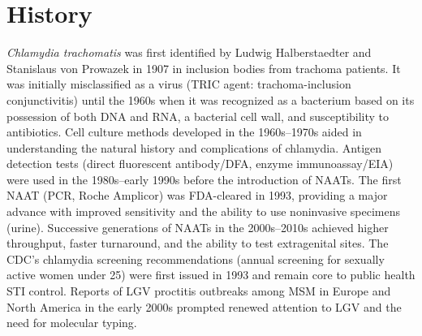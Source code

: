 \section*{History}
\textit{Chlamydia trachomatis} was first identified by Ludwig Halberstaedter and Stanislaus von Prowazek in 1907 in inclusion bodies from trachoma patients. It was initially misclassified as a virus (TRIC agent: trachoma-inclusion conjunctivitis) until the 1960s when it was recognized as a bacterium based on its possession of both DNA and RNA, a bacterial cell wall, and susceptibility to antibiotics. Cell culture methods developed in the 1960s--1970s aided in understanding the natural history and complications of chlamydia. Antigen detection tests (direct fluorescent antibody/DFA, enzyme immunoassay/EIA) were used in the 1980s--early 1990s before the introduction of NAATs. The first NAAT (PCR, Roche Amplicor) was FDA-cleared in 1993, providing a major advance with improved sensitivity and the ability to use noninvasive specimens (urine). Successive generations of NAATs in the 2000s--2010s achieved higher throughput, faster turnaround, and the ability to test extragenital sites. The CDC's chlamydia screening recommendations (annual screening for sexually active women under 25) were first issued in 1993 and remain core to public health STI control. Reports of LGV proctitis outbreaks among MSM in Europe and North America in the early 2000s prompted renewed attention to LGV and the need for molecular typing.

